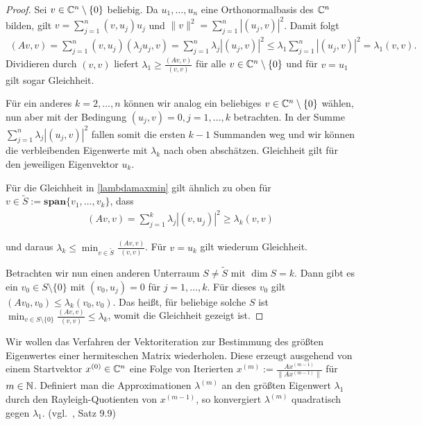 \documentclass{article}
\begin{document}
\begin{proof}
	Sei $v \in \mathbb{C}^n \setminus \{0\}$ beliebig. Da $u_1, \dots, u_n$ eine Orthonormalbasis des $\mathbb{C}^n$ bilden, gilt $ v = \sum_{j=1}^{n} (v,u_j) u_j$ und $\|v\|^2 = \sum_{j=1}^{n} |(u_j,v)|^2$. Damit folgt
	\begin{align*}
		(Av,v) = \sum_{j=1}^{n} (v,u_j) (\lambda_j u_j,v) = \sum_{j=1}^{n} \lambda_j |(u_j,v)|^2 \leq \lambda_1 \sum_{j=1}^{n} |(u_j,v)|^2 = \lambda_1 (v,v).
	\end{align*}
	Dividieren durch $(v,v)$ liefert $\lambda_1 \geq \frac{(Av,v)}{(v,v)}$ für alle $v \in \mathbb{C}^n \setminus \{0\}$ und für $v = u_1$ gilt sogar Gleichheit.

	Für ein anderes $k = 2,\dots,n$ können wir analog ein beliebiges $v \in \mathbb{C}^n \setminus \{0\}$ wählen, nun aber mit der Bedingung $(u_j,v) = 0, j=1,\dots,k$ betrachten. In der Summe $\sum_{j=1}^{n} \lambda_j |(u_j,v)|^2$ fallen somit die ersten $k-1$ Summanden weg und wir können die verbleibenden Eigenwerte mit $\lambda_k$ nach oben abschätzen. Gleichheit gilt für den jeweiligen Eigenvektor $u_k$.

	Für die Gleichheit in \ref{lambdamaxmin} gilt ähnlich zu oben für $v \in \tilde{S} := \textbf{span}\{v_1, \dots, v_k\}$, dass
	\begin{align*}
		(Av,v) = \sum_{j=1}^{k} \lambda_j |(v,u_j)|^2 \geq \lambda_k (v,v)
	\end{align*}

	und daraus $\lambda_k \leq \min_{v \in \tilde{S}} \frac{(Av,v)}{(v,v)}$. Für $v = u_k$ gilt wiederum Gleichheit.

	Betrachten wir nun einen anderen Unterraum $S \neq \tilde{S}$ mit $\dim S = k$. Dann gibt es ein $v_0 \in S \setminus \{0\}$ mit $(v_0,u_j) = 0$ für $j=1,\dots,k$. Für dieses $v_0$ gilt $(Av_0,v_0) \leq \lambda_k (v_0,v_0)$. Das heißt, für beliebige solche $S$ ist $\min_{v \in S \setminus \{0\}} \frac{(Av,v)}{(v,v)} \leq \lambda_k$, womit die Gleichheit gezeigt ist.
\end{proof}

Wir wollen das Verfahren der Vektoriteration zur Bestimmung des größten Eigenwertes einer hermiteschen Matrix wiederholen. Diese erzeugt ausgehend von einem Startvektor $x^{(0)} \in \mathbb{C}^{n}$ eine Folge von Iterierten $x^{(m)} := \frac{Ax^{(m-1)}}{\|Ax^{(m-1)}\|}$ für $m \in \mathbb{N}$. Definiert man die Approximationen $\lambda^{(m)}$ an den größten Eigenwert $\lambda_1$ durch den Rayleigh-Quotienten von $x^{(m-1)}$, so konvergiert $\lambda^{(m)}$ quadratisch gegen $\lambda_1$. (vgl.\ \cite{Num}, Satz 9.9)
\end{document}

